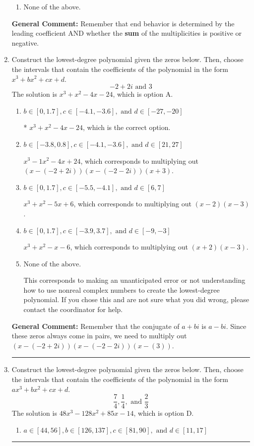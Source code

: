 \documentclass{extbook}[14pt]
\newcommand{\litem}[1]{\item #1

\rule{\textwidth}{0.4pt}}
\begin{document}
\begin{enumerate}
{\begin{enumerate}[label=\Alph*.]
\begin{multicols}{2}
\end{multicols}\item None of the above.\end{enumerate}
\textbf{General Comment:} Remember that end behavior is determined by the leading coefficient AND whether the \textbf{sum} of the multiplicities is positive or negative.
}
\litem{
Construct the lowest-degree polynomial given the zeros below. Then, choose the intervals that contain the coefficients of the polynomial in the form $x^3+bx^2+cx+d$.
\[ -2 + 2 i \text{ and } 3 \]The solution is \( x^{3} + x^{2} -4 x -24 \), which is option A.\begin{enumerate}[label=\Alph*.]
\item \( b \in [0, 1.7], c \in [-4.1, -3.6], \text{ and } d \in [-27, -20] \)

* $x^{3} + x^{2} -4 x -24$, which is the correct option.
\item \( b \in [-3.8, 0.8], c \in [-4.1, -3.6], \text{ and } d \in [21, 27] \)

$x^{3} -1 x^{2} -4 x + 24$, which corresponds to multiplying out $(x-(-2 + 2 i))(x-(-2 - 2 i))(x + 3)$.
\item \( b \in [0, 1.7], c \in [-5.5, -4.1], \text{ and } d \in [6, 7] \)

$x^{3} + x^{2} -5 x + 6$, which corresponds to multiplying out $(x -2)(x -3)$.
\item \( b \in [0, 1.7], c \in [-3.9, 3.7], \text{ and } d \in [-9, -3] \)

$x^{3} + x^{2} -x -6$, which corresponds to multiplying out $(x + 2)(x -3)$.
\item \( \text{None of the above.} \)

This corresponds to making an unanticipated error or not understanding how to use nonreal complex numbers to create the lowest-degree polynomial. If you chose this and are not sure what you did wrong, please contact the coordinator for help.
\end{enumerate}

\textbf{General Comment:} Remember that the conjugate of $a+bi$ is $a-bi$. Since these zeros always come in pairs, we need to multiply out $(x-(-2 + 2 i))(x-(-2 - 2 i))(x-(3))$.
}
\litem{
Construct the lowest-degree polynomial given the zeros below. Then, choose the intervals that contain the coefficients of the polynomial in the form $ax^3+bx^2+cx+d$.
\[ \frac{7}{4}, \frac{1}{4}, \text{ and } \frac{2}{3} \]The solution is \( 48x^{3} -128 x^{2} +85 x -14 \), which is option D.\begin{enumerate}[label=\Alph*.]
\item \( a \in [44, 56], b \in [126, 137], c \in [81, 90], \text{ and } d \in [11, 17] \)


\end{enumerate}}
\end{enumerate}
\end{document}
